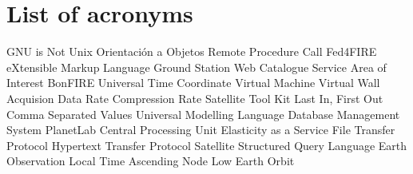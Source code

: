 \chapter{List of acronyms}

{\small
\begin{acronym}[XXXXXXXX]
       {\acs{GNU} is Not Unix}
        {Orientación a Objetos}
       {Remote Procedure Call}
       {Fed4FIRE}
      {eXtensible Markup Language}
      {Ground Station}
      {Web Catalogue Service}
     {Area of Interest}
      {BonFIRE}
    {Universal Time Coordinate}
     {Virtual Machine}
     {Virtual Wall}
    {Acquision Data Rate}
     {Compression Rate}
    {Satellite Tool Kit}
   {Last In, First Out}
    {Comma Separated Values}
    {Universal Modelling Language}
   {Database Management System}
     {PlanetLab}
    {Central Processing Unit}
   {Elasticity as a Service}
    {File Transfer Protocol}
   {Hypertext Transfer Protocol}
    {Satellite}
    {Structured Query Language}
  {Earth Observation}
  {Local Time Ascending Node}
  {Low Earth Orbit}
\end{acronym}
}




